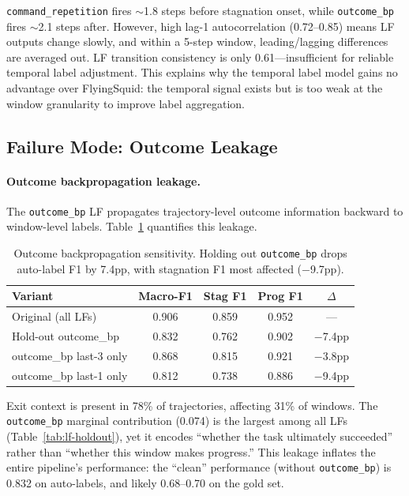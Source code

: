 \documentclass[11pt,a4paper]{article}
\begin{document}
\texttt{command\_repetition} fires ${\sim}$1.8 steps before stagnation onset, while \texttt{outcome\_bp} fires ${\sim}$2.1 steps after.
However, high lag-1 autocorrelation (0.72--0.85) means LF outputs change slowly, and within a 5-step window, leading/lagging differences are averaged out.
LF transition consistency is only 0.61---insufficient for reliable temporal label adjustment.
This explains why the temporal label model gains no advantage over FlyingSquid: the temporal signal exists but is too weak at the window granularity to improve label aggregation.

\subsection{Failure Mode: Outcome Leakage}
\label{sec:failure-modes}

\paragraph{Outcome backpropagation leakage.}
The \texttt{outcome\_bp} LF propagates trajectory-level outcome information backward to window-level labels.
Table~\ref{tab:outcome-bp} quantifies this leakage.

\begin{table}[t]
\centering
\small
\begin{tabular}{lcccc}
\toprule
\textbf{Variant} & \textbf{Macro-F1} & \textbf{Stag F1} & \textbf{Prog F1} & \textbf{$\Delta$} \\
\midrule
Original (all LFs) & 0.906 & 0.859 & 0.952 & --- \\
Hold-out outcome\_bp & 0.832 & 0.762 & 0.902 & $-$7.4pp \\
outcome\_bp last-3 only & 0.868 & 0.815 & 0.921 & $-$3.8pp \\
outcome\_bp last-1 only & 0.812 & 0.738 & 0.886 & $-$9.4pp \\
\bottomrule
\end{tabular}
\caption{Outcome backpropagation sensitivity. Holding out \texttt{outcome\_bp} drops auto-label F1 by 7.4pp, with stagnation F1 most affected ($-$9.7pp).}
\label{tab:outcome-bp}
\end{table}

Exit context is present in 78\% of trajectories, affecting 31\% of windows.
The \texttt{outcome\_bp} marginal contribution (0.074) is the largest among all LFs (Table~\ref{tab:lf-holdout}), yet it encodes ``whether the task ultimately succeeded'' rather than ``whether this window makes progress.''
This leakage inflates the entire pipeline's performance: the ``clean'' performance (without \texttt{outcome\_bp}) is 0.832 on auto-labels, and likely 0.68--0.70 on the gold set.
\end{document}
